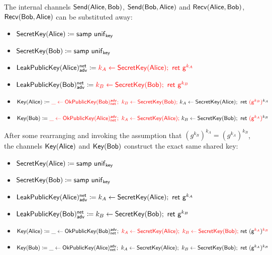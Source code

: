 \noindent The internal channels $\mathsf{Send}(\mathsf{Alice},\mathsf{Bob})$, $\mathsf{Send}(\mathsf{Bob},\mathsf{Alice})$ and $\mathsf{Recv}(\mathsf{Alice},\mathsf{Bob})$, $\mathsf{Recv}(\mathsf{Bob},\mathsf{Alice})$ can be substituted away:

\begin{itemize}
\item $\mathsf{SecretKey}(\mathsf{Alice}) \coloneqq \mathsf{samp} \ \mathsf{unif}_{\mathsf{key}}$
\item $\mathsf{SecretKey}(\mathsf{Bob}) \coloneqq \mathsf{samp} \ \mathsf{unif}_{\mathsf{key}}$
\item $\LeakPublicKey(\Alice)^\net_\adv \coloneqq {\color{red} k_A \leftarrow \SecretKey(\Alice); \ \ret{\gen^{k_A}}}$
\item $\LeakPublicKey(\Bob)^\net_\adv \coloneqq {\color{red} k_B \leftarrow \SecretKey(\Bob); \ \ret{\gen^{k_B}}}$
\item $\Key(\Alice) \coloneqq {\color{red} \_ \leftarrow \OkPublicKey(\Bob)^\adv_\net; \ k_B \leftarrow \SecretKey(\Bob); \ } k_A \leftarrow \SecretKey(\Alice); \ \ret{{\color{red} (\gen^{k_B})}^{k_A}}$
\item $\Key(\Bob) \coloneqq {\color{red} \_ \leftarrow \OkPublicKey(\Alice)^\adv_\net; \ k_A \leftarrow \SecretKey(\Alice); \ } k_B \leftarrow \SecretKey(\Bob); \ \ret{{\color{red} (\gen^{k_A})}^{k_B}}$
\end{itemize}

\noindent After some rearranging and invoking the assumption that $(g^{k_B})^{k_A} = (g^{k_A})^{k_B}$, the channels $\mathsf{Key}(\mathsf{Alice})$ and $\mathsf{Key}(\mathsf{Bob})$ construct the exact same shared key:

\begin{itemize}
\item $\mathsf{SecretKey}(\mathsf{Alice}) \coloneqq \mathsf{samp} \ \mathsf{unif}_{\mathsf{key}}$
\item $\mathsf{SecretKey}(\mathsf{Bob}) \coloneqq \mathsf{samp} \ \mathsf{unif}_{\mathsf{key}}$
\item $\LeakPublicKey(\Alice)^\net_\adv \coloneqq k_A \leftarrow \SecretKey(\Alice); \ \ret{\gen^{k_A}}$
\item $\LeakPublicKey(\Bob)^\net_\adv \coloneqq k_B \leftarrow \SecretKey(\Bob); \ \ret{\gen^{k_B}}$
\item $\mathsf{Key}(\mathsf{Alice}) \coloneqq \_ \leftarrow \mathsf{OkPublicKey}(\mathsf{Bob})^{\mathsf{adv}}_{\mathsf{net}}; \ {\color{red} k_A \leftarrow \mathsf{SecretKey}(\mathsf{Alice}); \ k_B \leftarrow \mathsf{SecretKey}(\mathsf{Bob}); \ } \mathsf{ret} \ (\mathsf{g}^{\color{red} k_A})^{\color{red} k_B}$
\item $\Key(\Bob) \coloneqq \_ \leftarrow \OkPublicKey(\Alice)^\adv_\net; \ k_A \leftarrow \SecretKey(\Alice); \ k_B \leftarrow \SecretKey(\Bob); \ \ret{(\gen^{k_A})^{k_B}}$
\end{itemize}


